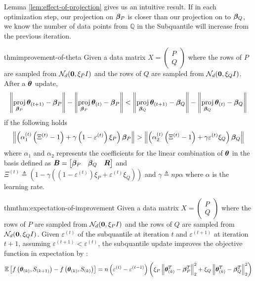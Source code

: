 \documentclass{article} %
\DeclareMathOperator{\proj}{proj}
\newcommand{\norm}[1]{\left\lVert#1\right\rVert}
\begin{document}
	Lemma \ref{lem:effect-of-projection} gives us an intuitive result. If in each optimization step, our projection on ${\bm{\beta}}_P$ is closer than our projection on to ${\bm{\beta}}_Q$, we know the number of data points from $\mathbb{Q}$ in the Subquantile will increase from the previous iteration.
	\begin{restatable}{thm}{improvement-of-theta}
		\label{thm:improvement-of-theta}
		Given a data matrix $X = \begin{pmatrix}P\\Q\end{pmatrix}$ where the rows of $P$ are sampled from $\mathcal{N}_d({\bm{0}}, \xi_P I)$ and the rows of $Q$ are sampled from $\mathcal{N}_d({\bm{0}}, \xi_Q I)$. After a ${\bm{\theta}}$ update, 
		\begin{equation*}
			\norm{\proj_{\vbeta_P}\vtheta_{(t+1)} - \vbeta_P} - \norm{\proj_{\vbeta_P}\vtheta_{(t)} - \vbeta_P} <  \norm{\proj_{\vbeta_Q}\vtheta_{(t+1)} - \vbeta_Q} - \norm{\proj_{\vbeta_Q}\vtheta_{(t)} - \vbeta_Q}
		\end{equation*}
			  if the following holds
		\begin{equation}
			\norm{\left(\alpha_1^{(t)}\left(\Xi^{(t)}-1\right) + \gamma\left(1-\varepsilon^{(t)}\right)\xi_P\right)\vbeta_P} > \norm{\left(\alpha_2^{(t)}\left(\Xi^{(t)}-1\right) + \gamma \varepsilon^{(t)}\xi_Q\right)\vbeta_Q}
		\end{equation}
		where $\alpha_1$ and $\alpha_2$ represents the coefficients for the linear combination of ${\bm{\theta}}$ in the basis defined as ${\bm{B}} = \begin{bmatrix} {\bm{\beta}}_P & {\bm{\beta}}_Q & {\bm{R}}\end{bmatrix}$ and $\displaystyle \Xi^{(t)} \triangleq \left(1 - \gamma\left(\left(1 - \varepsilon^{(t)}\right)\xi_P + \varepsilon^{(t)}\xi_Q\right)\right)$ and $\gamma \triangleq np\alpha$ where $\alpha$ is the learning rate. 
	\end{restatable}

	\begin{restatable}{thm}{thm:expectation-of-improvement}
		\label{thm:expectation-of-improvement}
		Given a data matrix $X = \begin{pmatrix}P\\Q\end{pmatrix}$ where the rows of $P$ are sampled from $\mathcal{N}_d({\bm{0}}, \xi_P I)$ and the rows of $Q$ are sampled from $\mathcal{N}_d({\bm{0}}, \xi_Q I)$. Given $\varepsilon^{(t)}$ of the subquantile at iteration $t$ and $\varepsilon^{(t+1)}$ at iteration $t+1$, assuming $\varepsilon^{(t+1)} < \varepsilon^{(t)}$, the subquantile update improves the objective function in expectation by :
			\begin{equation*}
			\mathbb{E}\left[f\left(\vtheta_{(k)}, S_{(k+1)}\right) - f\left(\vtheta_{(k)}, S_{(k)}\right)\right]= n\left(\varepsilon^{(t)} - \varepsilon^{(t-1)}\right) \left(\xi_P\norm{\vtheta_{(k)}^T - \vbeta_P^T}^2_2 + \xi_Q\norm{\vtheta_{(k)}^T - \vbeta_Q^T}^2_2\right)
		\end{equation*}
	\end{restatable}
\end{document}
